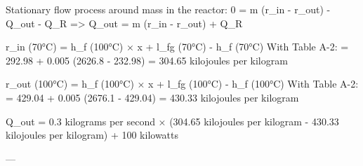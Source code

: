Stationary flow process around mass in the reactor:  
0 = m (r_in - r_out) - Q_out - Q_R  
=> Q_out = m (r_in - r_out) + Q_R  

r_in (70°C) = h_f (100°C) × x + l_fg (70°C) - h_f (70°C)  
With Table A-2:  
= 292.98 + 0.005 (2626.8 - 232.98)  
= 304.65 kilojoules per kilogram  

r_out (100°C) = h_f (100°C) × x + l_fg (100°C) - h_f (100°C)  
With Table A-2:  
= 429.04 + 0.005 (2676.1 - 429.04)  
= 430.33 kilojoules per kilogram  

Q_out = 0.3 kilograms per second × (304.65 kilojoules per kilogram - 430.33 kilojoules per kilogram) + 100 kilowatts  

---